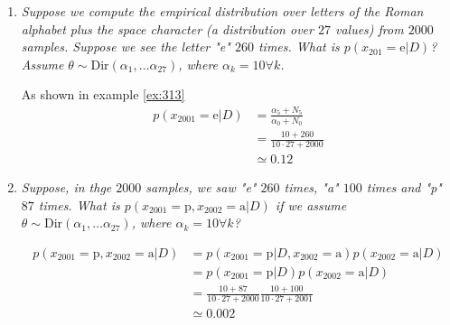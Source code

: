 \begin{example}
	
	\begin{enumerate}
		\item \emph{Suppose we compute the empirical distribution over letters of the Roman alphabet plus the space character (a distribution over $27$ values) from $2000$ samples. Suppose we see the letter "e" $260$ times. What is $p(x_{201}=\text{e}|D)$? Assume $\theta\sim \text{Dir}(\alpha_1,\dots \alpha_{27})$, where $\alpha_k=10\forall k$.}\newline
		
		As shown in example \ref{ex:313}
		\begin{equation}
			\begin{split}
				p(x_{2001}=\text{e}|D) & =\frac{\alpha_{5}+N_5}{\alpha_0+N_0}\\
				&= \frac{10+260}{10\cdot 27+2000}\\
				&\simeq 0.12
			\end{split}
		\end{equation}
		
		\item \emph{Suppose, in thge $2000$ samples, we saw "e" $260$ times, "a" $100$ times and "p" $87$ times. What is $p(x_{2001}=\text{p},x_{2002}=\text{a}|D)$ if we assume $\theta\sim \text{Dir}(\alpha_1,\dots \alpha_{27})$, where $\alpha_k=10\forall k$?}\newline
		
		\begin{equation}
			\begin{split}
				p(x_{2001}=\text{p},x_{2002}=\text{a}|D) & = p(x_{2001}=\text{p}|D,x_{2002}=\text{a})p(x_{2002}=\text{a}|D)\\
				&=p(x_{2001}=\text{p}|D)p(x_{2002}=\text{a}|D)\\
				&=\frac{10+87}{10\cdot 27+2000}\frac{10+100}{10\cdot 27+2001}\\
				&\simeq 0.002
			\end{split}
		\end{equation}
	\end{enumerate}
	
\end{example}


